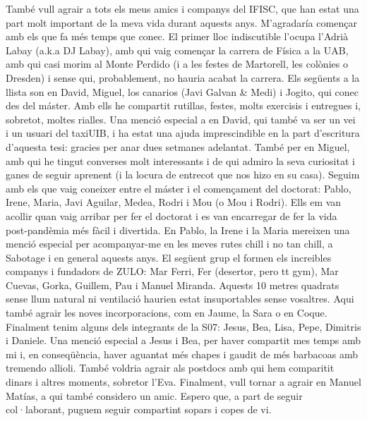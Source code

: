 {%
També vull agrair a tots els meus amics i companys del IFISC, que han estat una
part molt important de la meva vida durant aquests anys. M'agradaría començar
amb els que fa més temps que conec. El primer lloc indiscutible l'ocupa l'Adrià
Labay (a.k.a DJ Labay), amb qui vaig començar la carrera de Física a la UAB,
amb qui casi morim al Monte Perdido (i a les festes de Martorell, les colònies
o Dresden) i sense qui, probablement, no hauria acabat la carrera. Els següents
a la llista son en David, Miguel, los canarios (Javi Galvan \& Medi) i Jogito,
qui conec des del máster. Amb ells he compartit rutillas, festes, molts
exercisis i entregues i, sobretot, moltes rialles. Una menció especial a en
David, qui també va ser un vei i un usuari del taxiUIB, i ha estat una ajuda
imprescindible en la part d'escritura d'aquesta tesi: gracies per anar dues
setmanes adelantat. També per en Miguel, amb qui he tingut converses molt
interessants i de qui admiro la seva curiositat i ganes de seguir aprenent (i
la locura de entrecot que nos hizo en su casa). Seguim amb els que vaig
coneixer entre el máster i el començament del doctorat: Pablo, Irene, Maria,
Javi Aguilar, Medea, Rodri i Mou (o Mou i Rodri). Ells em van acollir quan vaig
arribar per fer el doctorat i es van encarregar de fer la vida post-pandèmia
més fàcil i divertida. En Pablo, la Irene i la Maria mereixen una menció
especial per acompanyar-me en les meves rutes chill i no tan chill, a Sabotage
i en general aquests anys. El següent grup el formen els increibles companys i
fundadors de ZULO: Mar Ferri, Fer (desertor, pero tt gym), Mar Cuevas, Gorka,
Guillem, Pau i Manuel Miranda. Aquests 10 metres quadrats sense llum natural ni
ventilació haurien estat insuportables sense vosaltres. Aqui també agrair les
noves incorporacions, com en Jaume, la Sara o en Coque. Finalment tenim alguns
dels integrants de la S07: Jesus, Bea, Lisa, Pepe, Dimitris i Daniele. Una
menció especial a Jesus i Bea, per haver compartit mes temps amb mi i, en
conseqüència, haver aguantat més chapes i gaudit de més barbacoas amb tremendo
allioli. També voldria agrair als postdocs amb qui hem comparitit dinars i
altres moments, sobretor l'Eva. Finalment, vull tornar a agrair en Manuel
Matías, a qui també considero un amic. Espero que, a part de seguir
col·laborant, puguem seguir compartint sopars i copes de vi. \\

}
